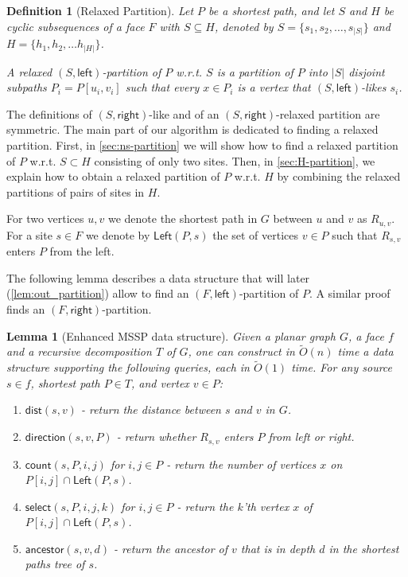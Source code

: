 \documentclass{article}
\newcommand{\Left}{\mathsf{Left}}
\newcommand{\leftside}{\mathsf{left}}
\newcommand{\rightside}{\mathsf{right}}
\newcommand{\dist}{\mathsf{dist}}
\newcommand{\direction}{\mathsf{direction}}
\newcommand{\countA}{\mathsf{count}}
\newcommand{\select}{\mathsf{select}}
\newcommand{\ancestor}{\mathsf{ancestor}}
\newtheorem{lemma}{Lemma}
\newtheorem{definition}{Definition}
\newcommand{\Otild}{\tilde{O}}
\begin{document}
\begin{definition}[Relaxed Partition]
Let $P$ be a shortest path, and let
$S$ and $H$ be cyclic subsequences of a face $F$ with $S\subseteq H$, denoted by $S=\{s_1,s_2,\ldots, s_{|S|}\}$ and $H=\{h_1,h_2,\ldots h_{|H|}\}$.

A relaxed $(S,\leftside)$-partition of $P$ w.r.t. $S$ is a partition of $P$ into $|S|$ disjoint subpaths $P_i=P[u_i,v_i]$ such that every $x\in P_i$ is a vertex that $(S,\leftside)$-likes $s_i$.
\end{definition}
The definitions of $(S,\rightside)$-like and of an $(S,\rightside)$-relaxed partition are symmetric.
The main part of our algorithm is dedicated to finding a relaxed partition.
First, in \cref{sec:ns-partition}
we will show how to find a relaxed partition of $P$ w.r.t. $S \subset H$ consisting of only two sites.
Then, in \cref{sec:H-partition}, we explain how to obtain a relaxed partition of $P$ w.r.t. $H$ by combining the relaxed partitions of pairs of sites in $H$.




For two vertices $u,v$ we denote the shortest path in $G$ between $u$ and $v$ as $R_{u,v}$.
For a site $s\in F$ we denote by $\Left(P,s)$ the set of vertices $v\in P$ such that $R_{s,v}$ enters $P$ from the left.


The following lemma describes a data structure that will later (\cref{lem:out_partition}) allow to find an $(F,\leftside)$-partition of $P$. A similar proof finds an $(F,\rightside)$-partition.


\begin{lemma}[Enhanced MSSP data structure]\label{lem:enhanced_mssp}
    Given a planar graph $G$, a face $f$ and a recursive decomposition $T$ of $G$, one can construct in $\Otild(n)$ time a data structure supporting the following queries, each in $\Otild(1)$ time. For any source $s\in f$, shortest path $P \in T$, and vertex $v\in P$:
    \begin{enumerate}
        \item $\dist(s,v)$ - return the distance between $s$ and $v$ in $G$.
        \item $\direction(s,v,P)$ - return whether $R_{s,v}$ enters $P$ from left or right.
        \item $\countA(s,P,i,j)$ for $i,j\in P$ - return the number of vertices $x$ on $P[i,j]\cap \Left(P,s)$.
        \item $\select(s,P,i,j,k)$ for $i,j\in P$ - return the $k$'th vertex $x$ of $P[i,j]\cap \Left(P,s)$.
        \item $\ancestor(s,v,d)$ - return the ancestor of $v$ that is in depth $d$ in the shortest paths tree of $s$.
    \end{enumerate}
\end{lemma}
\end{document}
